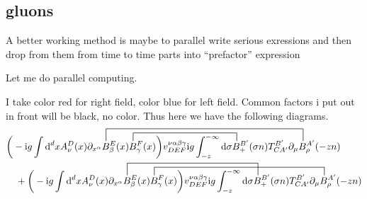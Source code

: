 \ifdefined\mainprogram{}
\else

\fi

\subsection{gluons}

A better working method is maybe to parallel write serious exressions and then drop from them from time to time parts into ``prefactor'' expression

Let me do parallel computing. 

I take color red for right field, color blue for left field. Common factors i put out in front will be black, no color.
Thus here we have the following diagrams.
{\color{red}
\begin{align}
	&\contraction[3ex]{\bigg(-\imag g \int \ddx xA_\nu^D(x) \partial_{x^\alpha}}{B}{_\beta^{E} (x) B_\gamma^F(x) \bigg) v^{\nu \alpha\beta\gamma}_{DEF}\imag g \int_{-z}^{-\infty} \dx \sigma B_+^{B'}(\sigma n) T^{B'}_{CA'}\partial_\mu}{B}
	\contraction[2ex]{\bigg(-\imag g \int \ddx xA_\nu^D(x) \partial_{x^\alpha} B_\beta^{E} (x) }{B}{_\gamma^F(x) \bigg) v^{\nu \alpha\beta\gamma}_{DEF}\imag g \int_{-z}^{-\infty} \dx \sigma }{B}
	\bigg(-\imag g \int \ddx xA_\nu^D(x) \partial_{x^\alpha} B_\beta^{E} (x) B_\gamma^F(x) \bigg) v^{\nu \alpha\beta\gamma}_{DEF}\imag g \int_{-z}^{-\infty} \dx \sigma B_+^{B'}(\sigma n) T^{B'}_{CA'}\partial_\mu B^{A'}_\rho (-zn) 
	\nl
	+
	\contraction[3ex]{\bigg(-\imag g \int \ddx xA_\nu^D(x) \partial_{x^\alpha}}{B}{_\beta^{E} (x) B_\gamma^F(x) \bigg) v^{\nu \alpha\beta\gamma}_{DEF}\imag g \int_{-z}^{-\infty} \dx \sigma}{B}
	\contraction[2ex]{\bigg(-\imag g \int \ddx xA_\nu^D(x) \partial_{x^\alpha} B_\beta^{E} (x)}{B}{_\gamma^F(x) \bigg) v^{\nu \alpha\beta\gamma}_{DEF}\imag g \int_{-z}^{-\infty} \dx \sigma B_+^{B'}(\sigma n) T^{B'}_{CA'}\partial_\mu}{B}
	\bigg(-\imag g \int \ddx xA_\nu^D(x) \partial_{x^\alpha} B_\beta^{E} (x) B_\gamma^F(x) \bigg) v^{\nu \alpha\beta\gamma}_{DEF}\imag g \int_{-z}^{-\infty} \dx \sigma B_+^{B'}(\sigma n) T^{B'}_{CA'}\partial_\mu B^{A'}_\rho (-zn)
\end{align}
}
